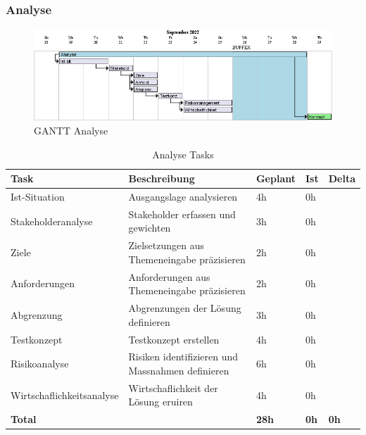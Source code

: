   \subsubsection{Analyse}
  \begin{figure}[H]
    \begin{center}
      \includegraphics[width=1\linewidth]{../content/diagrams/gantt/analisisPlanning/analisisPlanning.png}
      \caption{GANTT Analyse}
    \end{center}
  \end{figure}
  \begin{table}[H]
    \centering
    \settowidth{}
    \setlength\extrarowheight{2pt}
    \begin{tabulary}{1.0\textwidth}{|L|L|L|L|L|}
      \hline
      \textbf{Task} &
      \textbf{Beschreibung} &
      \textbf{Geplant}&
      \textbf{Ist}&
      \textbf{Delta}\\
      \hline
      Ist-Situation &
      Ausgangslage analysieren &
      4h &
      0h &
      \\
      \hline
      Stakeholderanalyse &
      Stakeholder erfassen und gewichten &
      3h &
      0h &
      \\
      \hline
      Ziele &
      Zielsetzungen aus Themeneingabe präzisieren &
      2h &
      0h &
      \\
      \hline
      Anforderungen &
      Anforderungen aus Themeneingabe präzisieren &
      2h &
      0h &
      \\
      \hline
      Abgrenzung &
      Abgrenzungen der Lösung definieren &
      3h &
      0h &
      \\
      \hline
      Testkonzept &
      Testkonzept erstellen &
      4h &
      0h &
      \\
      \hline
      Risikoanalyse &
      Risiken identifizieren und Massnahmen definieren &
      6h &
      0h &
      \\
      \hline
      Wirtschaflichkeitsanalyse &
      Wirtschaflichkeit der Lösung eruiren &
      4h &
      0h &
      \\
      \hline
      \textbf{Total} &
       &
      \textbf{28h} &
      \textbf{0h} &
      \textbf{0h} \\
      \hline
    \end{tabulary}
    \caption{Analyse Tasks}
  \end{table}

